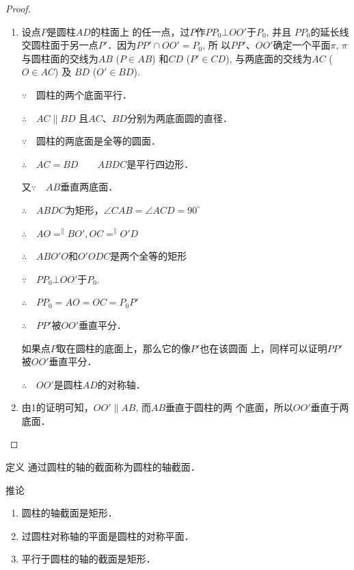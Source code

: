 \begin{proof}
\begin{enumerate}
    \item 

设点$P$是圆柱$AD$的柱面上
的任一点，过$P$作$PP_0\bot OO'$于$P_0$, 并且
$PP_0$的延长线交圆柱面于另一点$P'$．因为$PP'\cap OO'=P_0$, 所
以$PP'$、$OO'$确定一个平面$\pi$, $\pi$与圆柱面的交线为$AB$ ($P\in
AB$) 和$CD$ ($P'\in CD$), 与两底面的交线为$AC$ ($O\in AC$) 及
$BD$ ($O'\in BD$).

$\because\quad $圆柱的两个底面平行．

$\therefore\quad AC\parallel BD$ 且$AC$、$BD$分别为两底面圆的直径．

$\because\quad $圆柱的两底面是全等的圆面．

$\therefore\quad AC=BD\qquad ABDC$是平行四边形．

又$\because\quad AB$垂直两底面．

$\therefore\quad ABDC$为矩形，$\angle CAB=\angle ACD=90^{\circ}$

$\therefore\quad AO\displaystyle\mathop{=}^{\parallel}BO', OC\displaystyle\mathop{=}^{\parallel}O'D$

$\therefore\quad ABO'O$和$O'ODC$是两个全等的矩形

$\because\quad PP_0\bot OO'$于$P_0$.

$\therefore\quad PP_0=AO=OC=P_0P'$

$\therefore\quad PP'$被$OO'$垂直平分．

如果点$P$取在圆柱的底面上，那么它的像$P'$也在该圆面
上，同样可以证明$PP'$被$OO'$垂直平分．

$\therefore\quad OO'$是圆柱$AD$的对称轴．

\item 由1的证明可知，$OO'\parallel AB$, 而$AB$垂直于圆柱的两
个底面，所以$OO'$垂直于两底面．
\end{enumerate}
\end{proof}

\begin{blk}{定义}
    通过圆柱的轴的截面称为圆柱的轴截面．
\end{blk}

\begin{blk}{推论}
\begin{enumerate}
    \item 圆柱的轴截面是矩形．
    \item 过圆柱对称轴的平面是圆柱的对称平面．
    \item 平行于圆柱的轴的截面是矩形．
\end{enumerate}
\end{blk}

